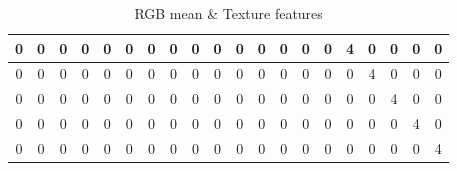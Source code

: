 \documentclass{IEEEtran}
\begin{document}
\begin{table}[h!]
\begin{tabular}{|c|c|c|c|c|c|c|c|c|c|c|c|c|c|c|c|c|c|c|c|}
\hline
0 & 0 & 0 & 0 & 0 & 0 & 0 & 0 & 0 & 0 & 0 & 0 & 0 & 0 & 0 & \cellcolor{purple!30}4 & 0 & 0 & 0 & 0\\
\hline
0 & 0 & 0 & 0 & 0 & 0 & 0 & 0 & 0 & 0 & 0 & 0 & 0 & 0 & 0 & 0 & \cellcolor{purple!30}4 & 0 & 0 & 0\\
\hline
0 & 0 & 0 & 0 & 0 & 0 & 0 & 0 & 0 & 0 & 0 & 0 & 0 & 0 & 0 & 0 & 0 & \cellcolor{purple!30}4 & 0 & 0\\
\hline
0 & 0 & 0 & 0 & 0 & 0 & 0 & 0 & 0 & 0 & 0 & 0 & 0 & 0 & 0 & 0 & 0 & 0 & \cellcolor{purple!30}4 & 0\\
\hline
0 & 0 & 0 & 0 & 0 & 0 & 0 & 0 & 0 & 0 & 0 & 0 & 0 & 0 & 0 & 0 & 0 & 0 & 0 & \cellcolor{purple!30}4\\
\hline
\end{tabular}
\caption{RGB mean \& Texture features}
\label{tb:rgb_texture}
\end{table}
\end{document}
